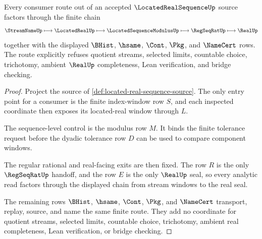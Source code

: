\begin{theorem}
\label{thm:located-real-sequence-kernel-scope}
Every consumer route out of an accepted $\LocatedRealSequenceUp$ source factors through the finite chain
$$
\StreamNameUp\longmapsto\LocatedRealUp\longmapsto\LocatedSequenceModulusUp\longmapsto\RegSeqRatUp\longmapsto\RealUp
$$
together with the displayed $\BHist$, $\hsame$, $\Cont$, $\Pkg$, and $\NameCert$ rows. The route explicitly refuses quotient streams, selected limits, countable choice, trichotomy, ambient $\RealUp$ completeness, Lean verification, and bridge checking.
\end{theorem}
\begin{proof}
Project the source of \autoref{def:located-real-sequence-source}. The only entry point for a consumer is the finite index-window row $S$, and each inspected coordinate then exposes its located-real window through $L$.

The sequence-level control is the modulus row $M$. It binds the finite tolerance request before the dyadic tolerance row $D$ can be used to compare component windows.

The regular rational and real-facing exits are then fixed. The row $R$ is the only $\RegSeqRatUp$ handoff, and the row $E$ is the only $\RealUp$ seal, so every analytic read factors through the displayed chain from stream windows to the real seal.

The remaining rows $\BHist$, $\hsame$, $\Cont$, $\Pkg$, and $\NameCert$ transport, replay, source, and name the same finite route. They add no coordinate for quotient streams, selected limits, countable choice, trichotomy, ambient real completeness, Lean verification, or bridge checking.
\end{proof}


